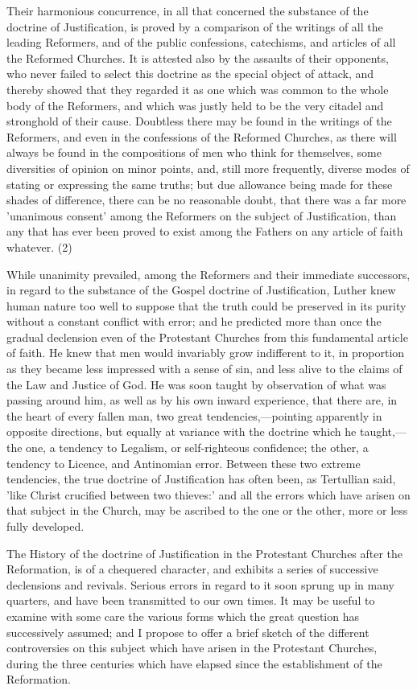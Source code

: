 \documentclass[
]{book}
\begin{document}
Their harmonious concurrence, in all that concerned the substance of the doctrine of Justification, is proved by a comparison of the writings of all the leading Reformers, and of the public confessions, catechisms, and articles of all the Reformed Churches. It is attested also by the assaults of their opponents, who never failed to select this doctrine as the special object of attack, and thereby showed that they regarded it as one which was common to the whole body of the Reformers, and which was justly held to be the very citadel and stronghold of their cause. Doubtless there may be found in the writings of the Reformers, and even in the confessions of the Reformed Churches, as there will always be found in the compositions of men who think for themselves, some diversities of opinion on minor points, and, still more frequently, diverse modes of stating or expressing the same truths; but due allowance being made for these shades of difference, there can be no reasonable doubt, that there was a far more 'unanimous consent' among the Reformers on the subject of Justification, than any that has ever been proved to exist among the Fathers on any article of faith whatever. (2)

While unanimity prevailed, among the Reformers and their immediate successors, in regard to the substance of the Gospel doctrine of Justification, Luther knew human nature too well to suppose that the truth could be preserved in its purity without a constant conflict with error; and he predicted more than once the gradual declension even of the Protestant Churches from this fundamental article of faith. He knew that men would invariably grow indifferent to it, in proportion as they became less impressed with a sense of sin, and less alive to the claims of the Law and Justice of God. He was soon taught by observation of what was passing around him, as well as by his own inward experience, that there are, in the heart of every fallen man, two great tendencies,---pointing apparently in opposite directions, but equally at variance with the doctrine which he taught,---the one, a tendency to Legalism, or self-righteous confidence; the other, a tendency to Licence, and Antinomian error. Between these two extreme tendencies, the true doctrine of Justification has often been, as Tertullian said, 'like Christ crucified between two thieves:' and all the errors which have arisen on that subject in the Church, may be ascribed to the one or the other, more or less fully developed.

The History of the doctrine of Justification in the Protestant Churches after the Reformation, is of a chequered character, and exhibits a series of successive declensions and revivals. Serious errors in regard to it soon sprung up in many quarters, and have been transmitted to our own times. It may be useful to examine with some care the various forms which the great question has successively assumed; and I propose to offer a brief sketch of the different controversies on this subject which have arisen in the Protestant Churches, during the three centuries which have elapsed since the establishment of the Reformation.
\end{document}
